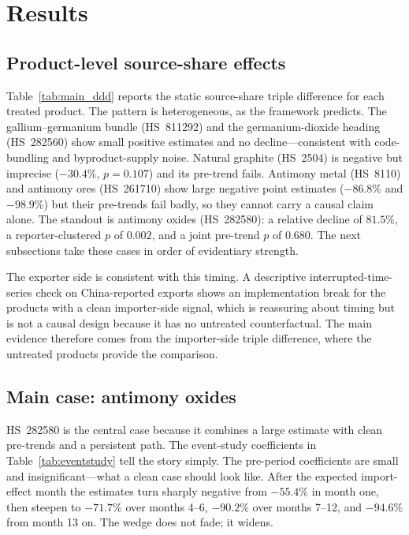 \documentclass[12pt,a4paper]{article}
\begin{document}
\section{Results}\label{sec:results}

\subsection{Product-level source-share effects}\label{sec:productlevel}

Table~\ref{tab:main_ddd} reports the static source-share triple difference for
each treated product. The pattern is heterogeneous, as the framework predicts.
The gallium--germanium bundle (HS~811292) and the germanium-dioxide heading
(HS~282560) show small positive estimates and no decline---consistent with
code-bundling and byproduct-supply noise. Natural graphite (HS~2504) is negative
but imprecise ($-30.4\%$, $p=0.107$) and its pre-trend fails. Antimony metal
(HS~8110) and antimony ores (HS~261710) show large negative point estimates
($-86.8\%$ and $-98.9\%$) but their pre-trends fail badly, so they cannot carry
a causal claim alone. The standout is antimony oxides (HS~282580): a relative
decline of $81.5\%$, a reporter-clustered $p$ of $0.002$, and a joint pre-trend
$p$ of $0.680$. The next subsections take these cases in order of evidentiary
strength.

The exporter side is consistent with this timing. A descriptive
interrupted-time-series check on China-reported exports shows an implementation
break for the products with a clean importer-side signal, which is reassuring
about timing but is not a causal design because it has no untreated
counterfactual. The main evidence therefore comes from the importer-side triple
difference, where the untreated products provide the comparison.



\subsection{Main case: antimony oxides}\label{sec:antimonyoxide}

HS~282580 is the central case because it combines a large estimate with clean
pre-trends and a persistent path. The event-study coefficients in
Table~\ref{tab:eventstudy} tell the story simply. The pre-period coefficients are
small and insignificant---what a clean case should look like. After the expected
import-effect month the estimates turn sharply negative from $-55.4\%$ in month
one, then steepen to $-71.7\%$ over months 4--6, $-90.2\%$ over months 7--12, and
$-94.6\%$ from month 13 on. The wedge does not fade; it widens.
\end{document}
